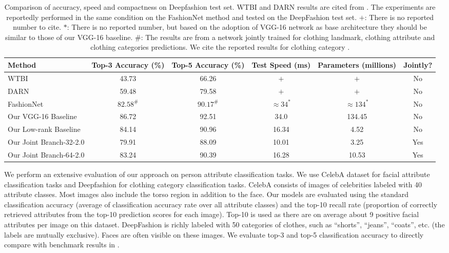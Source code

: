 \documentclass[10pt,twocolumn,letterpaper]{article}
\begin{document}
\begin{table*}
	\begin{center} \small
		\begin{tabular}{|l|c|c|c|c|c|}
			\hline
			\bf Method & \bf Top-3 Accuracy (\%) & \bf Top-5 Accuracy (\%) & \bf Test Speed (ms) & \bf Parameters (millions) & \bf Jointly? \\ \hline
			WTBI & 43.73 & 66.26 & $+$ & $+$ & No \\
			DARN & 59.48 & 79.58 & $+$ & $+$ & No \\
			FashionNet & ${82.58}^{\#}$ & ${90.17}^{\#}$ & $\approx 34^*$ & $\approx 134^*$ & No \\ \hline
			Our VGG-16 Baseline & 86.72 & 92.51 & 34.0 & 134.45 & No \\
			Our Low-rank Baseline & 84.14 & 90.96 & 16.34 & 4.52 & No \\ \hline
			Our Joint Branch-32-2.0 & 79.91 & 88.09 & 10.01 & 3.25 & Yes \\
			Our Joint Branch-64-2.0 & 83.24 & 90.39 & 16.28 & 10.53 & Yes \\
			\hline
		\end{tabular}
	\end{center}
	\caption{Comparison of accuracy, speed and compactness on Deepfashion test set. WTBI and DARN results are cited from \cite{liu2016deepfashion}. The experiments are reportedly performed in the same condition on the FashionNet method and tested on the DeepFashion test set. $+$: There is no reported number to cite. $*$: There is no reported number, but based on the adoption of VGG-16 network as base architecture they should be similar to those of our VGG-16 baseline. $\#$: The results are from a network jointly trained for clothing landmark, clothing attribute and clothing categories predictions. We cite the reported results for clothing category \cite{liu2016deepfashion}.}
	\label{tab:deepfashion_complexity}
	\vspace{-3mm}
\end{table*}

We perform an extensive evaluation of our approach on person attribute classification tasks. We use CelebA \cite{liu2015deep} dataset for facial attribute classification tasks and Deepfashion \cite{liu2016deepfashion} for clothing category classification tasks. 
CelebA consists of images of celebrities labeled with 40 attribute classes. Most images also include the torso region in addition to the face. Our models are evaluated using the standard classification accuracy (average of classification accuracy rate over all attribute classes) and the top-10 recall rate (proportion of correctly retrieved attributes from the top-10 prediction scores for each image). Top-10 is used as there are on average about 9 positive facial attributes per image on this dataset. 
DeepFashion is richly labeled with 50 categories of clothes, such as ``shorts'', ``jeans'', ``coats'', etc. (the labels are mutually exclusive).  Faces are often visible on these images. We evaluate top-3 and top-5 classification accuracy to directly compare with benchmark results in \cite{liu2016deepfashion}.
\end{document}
